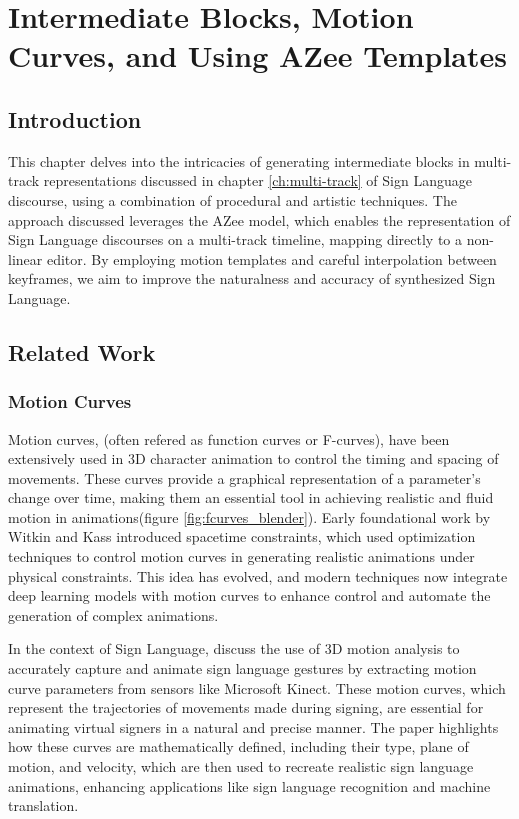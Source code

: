 \documentclass[../../main.tex]{subfiles}
\begin{document}
\chapter{Intermediate Blocks, Motion Curves, and Using AZee Templates}
\label{ch:intermediate_blocks}

\section{Introduction}

This chapter delves into the intricacies of generating intermediate blocks in multi-track representations discussed in chapter \ref{ch:multi-track} of Sign Language discourse, using a combination of procedural and artistic techniques. The approach discussed leverages the AZee model, which enables the representation of Sign Language discourses on a multi-track timeline, mapping directly to a non-linear editor. By employing motion templates and careful interpolation between keyframes, we aim to improve the naturalness and accuracy of synthesized Sign Language.

\section{Related Work}

\subsection{Motion Curves}

Motion curves, (often refered as function curves or F-curves), have been extensively used in 3D character animation to control the timing and spacing of movements. These curves provide a graphical representation of a parameter's change over time, making them an essential tool in achieving realistic and fluid motion in animations(figure \ref{fig:fcurves_blender}). Early foundational work by Witkin and Kass \cite{witkin1988spacetime} introduced spacetime constraints, which used optimization techniques to control motion curves in generating realistic animations under physical constraints. This idea has evolved, and modern techniques now integrate deep learning models with motion curves to enhance control and automate the generation of complex animations.

In the context of Sign Language, \cite{inproceedings} discuss the use of 3D motion analysis to accurately capture and animate sign language gestures by extracting motion curve parameters from sensors like Microsoft Kinect. These motion curves, which represent the trajectories of movements made during signing, are essential for animating virtual signers in a natural and precise manner. The paper highlights how these curves are mathematically defined, including their type, plane of motion, and velocity, which are then used to recreate realistic sign language animations, enhancing applications like sign language recognition and machine translation.
\end{document}
